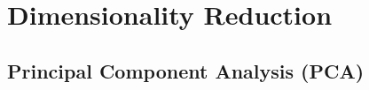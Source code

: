 \documentclass{article}
\newcommand{\hrfullline}{\noindent\makebox[\linewidth]{\rule{\paperwidth}{2pt}}}
\begin{document}
\hrfullline
\newpage

\section{Dimensionality Reduction}


\subsection{Principal Component Analysis (PCA)}
\end{document}
